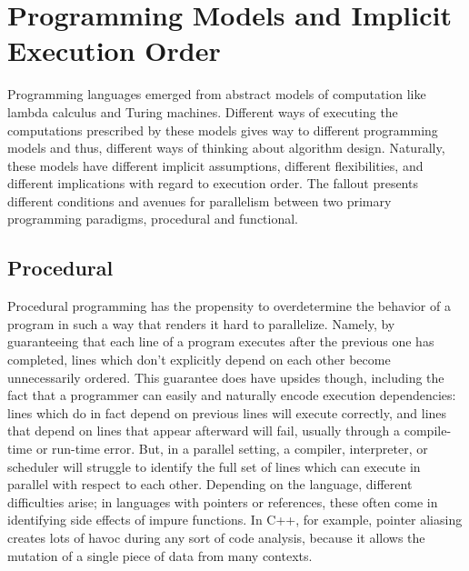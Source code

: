 \section{Programming Models and Implicit Execution Order}
Programming languages emerged from abstract models of computation like lambda
calculus and Turing machines. Different ways of executing the computations
prescribed by these models gives way to different programming models and thus,
different ways of thinking about algorithm design. Naturally, these models have
different implicit assumptions, different flexibilities, and different
implications with regard to execution order. The fallout presents different
conditions and avenues for parallelism between two primary programming
paradigms, procedural and functional.

\subsection{Procedural}
Procedural programming has the propensity to overdetermine the behavior of a
program in such a way that renders it hard to parallelize. Namely, by
guaranteeing that each line of a program executes after the previous one has
completed, lines which don't explicitly depend on each other become
unnecessarily ordered. This guarantee does have upsides though, including the
fact that a programmer can easily and naturally encode execution dependencies:
lines which do in fact depend on previous lines will execute correctly, and
lines that depend on lines that appear afterward will fail, usually through a
compile-time or run-time error. But, in a parallel setting, a compiler,
interpreter, or scheduler will struggle to identify the full set of lines which
can execute in parallel with respect to each other. Depending on the language,
different difficulties arise; in languages with pointers or references, these
often come in identifying side effects of impure functions. In C++, for example,
pointer aliasing creates lots of havoc during any sort of code analysis, because
it allows the mutation of a single piece of data from many contexts.

